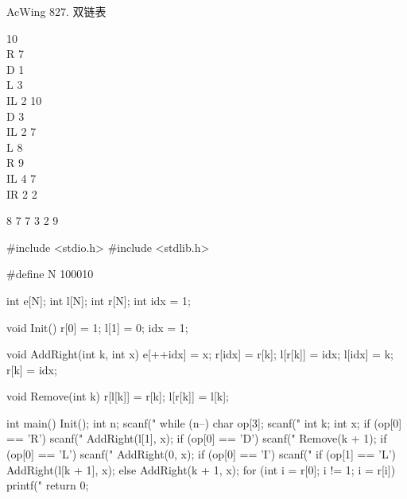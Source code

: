 \begin{titledbox}{AcWing 827. 双链表}
    \begin{inputblock}
        10 \\
        R 7 \\
        D 1 \\
        L 3 \\
        IL 2 10 \\
        D 3 \\
        IL 2 7 \\
        L 8 \\
        R 9 \\
        IL 4 7 \\
        IR 2 2
    \end{inputblock}
    \begin{outputblock}
        8 7 7 3 2 9
    \end{outputblock}
\end{titledbox}

\begin{mycpptwocol}[双链表]
    #include <stdio.h>
    #include <stdlib.h>

    #define N 100010

    int e[N];
    int l[N];
    int r[N];
    int idx = 1;

    void Init()
        {
        r[0] = 1;
        l[1] = 0;
        idx = 1;
    }

    void AddRight(int k, int x)
        {
        e[++idx] = x;
        r[idx] = r[k];
        l[r[k]] = idx;
        l[idx] = k;
        r[k] = idx;
    }

    void Remove(int k)
        {
        r[l[k]] = r[k];
        l[r[k]] = l[k];
    }

    int main()
        {
        Init();
        int n;
        scanf("%
        while (n--) {
            char op[3];
            scanf("%
            int k;
            int x;
            if (op[0] == 'R') {
                scanf("%
                AddRight(l[1], x);
            }
            if (op[0] == 'D') {
                scanf("%
                Remove(k + 1);
            }
            if (op[0] == 'L') {
                scanf("%
                AddRight(0, x);
            }
            if (op[0] == 'I') {
                scanf("%
                if (op[1] == 'L') {
                    AddRight(l[k + 1], x);
                } else {
                    AddRight(k + 1, x);
                }
            }
        }
        for (int i = r[0]; i != 1; i = r[i]) {
            printf("%
        }
        return 0;
    }
\end{mycpptwocol}


